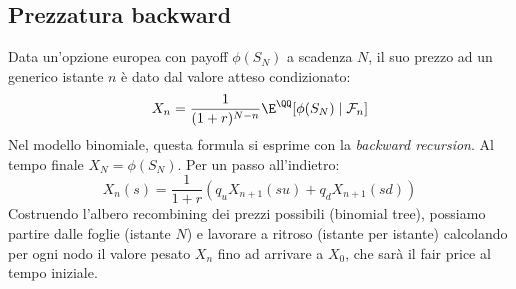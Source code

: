 \subsection{Prezzatura backward}
Data un'opzione europea con payoff $\phi(S_N)$ a scadenza $N$, il suo prezzo ad un generico istante $n$ è dato dal valore atteso condizionato:
\[ X_n = \frac{1}{(1+r)^{N-n}} \E^\QQ[\phi(S_N) \mid \mathcal{F}_n] \]
Nel modello binomiale, questa formula si esprime con la \emph{backward recursion}. Al tempo finale $X_N = \phi(S_N)$. Per un passo all'indietro:
\[ X_n(s) = \frac{1}{1+r} \left( q_u X_{n+1}(su) + q_d X_{n+1}(sd) \right) \]
Costruendo l'albero recombining dei prezzi possibili (binomial tree), possiamo partire dalle foglie (istante $N$) e lavorare a ritroso (istante per istante) calcolando per ogni nodo il valore pesato $X_n$ fino ad arrivare a $X_0$, che sarà il fair price al tempo iniziale.
